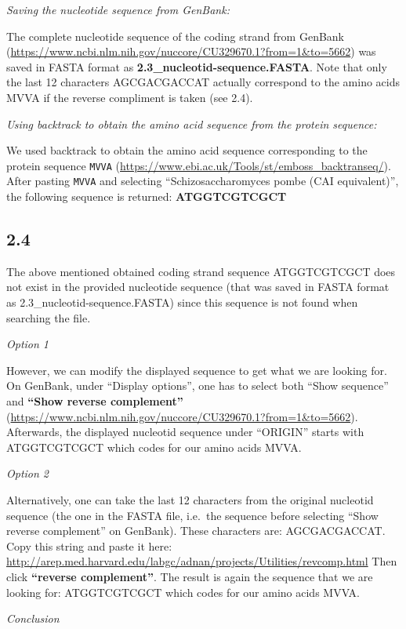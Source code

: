 \documentclass[]{article}
\begin{document}
\emph{Saving the nucleotide sequence from GenBank:}

The complete nucleotide sequence of the coding strand from GenBank
(\url{https://www.ncbi.nlm.nih.gov/nuccore/CU329670.1?from=1\&to=5662})
was saved in FASTA format as \textbf{2.3\_nucleotid-sequence.FASTA}.
Note that only the last 12 characters AGCGACGACCAT actually correspond
to the amino acids MVVA if the reverse compliment is taken (see 2.4).

\emph{Using backtrack to obtain the amino acid sequence from the protein
sequence:}

We used backtrack to obtain the amino acid sequence corresponding to the
protein sequence \texttt{MVVA}
(\url{https://www.ebi.ac.uk/Tools/st/emboss_backtranseq/}). After
pasting \texttt{MVVA} and selecting ``Schizosaccharomyces pombe (CAI
equivalent)'', the following sequence is returned: \textbf{ATGGTCGTCGCT}

\subsection{2.4}\label{section-3}

The above mentioned obtained coding strand sequence ATGGTCGTCGCT does
not exist in the provided nucleotide sequence (that was saved in FASTA
format as 2.3\_nucleotid-sequence.FASTA) since this sequence is not
found when searching the file.

\emph{Option 1}

However, we can modify the displayed sequence to get what we are looking
for. On GenBank, under ``Display options'', one has to select both
``Show sequence'' and \textbf{``Show reverse complement''}
(\url{https://www.ncbi.nlm.nih.gov/nuccore/CU329670.1?from=1\&to=5662}).
Afterwards, the displayed nucleotid sequence under ``ORIGIN'' starts
with ATGGTCGTCGCT which codes for our amino acids MVVA.

\emph{Option 2}

Alternatively, one can take the last 12 characters from the original
nucleotid sequence (the one in the FASTA file, i.e.~the sequence before
selecting ``Show reverse complement'' on GenBank). These characters are:
AGCGACGACCAT. Copy this string and paste it here:
\url{http://arep.med.harvard.edu/labgc/adnan/projects/Utilities/revcomp.html}
Then click \textbf{``reverse complement''}. The result is again the
sequence that we are looking for: ATGGTCGTCGCT which codes for our amino
acids MVVA.

\emph{Conclusion}
\end{document}
